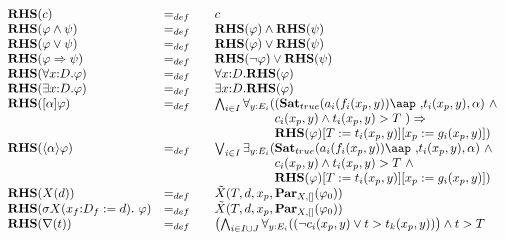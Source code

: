 \documentclass{article}
\begin{document}
\begin{equation*}
\begin{array}{lll}
{\mathbf{RHS}}(c) & =_{def} & c \\ 
{\mathbf{RHS}}(\varphi \wedge \psi ) & =_{def} & {\mathbf{RHS}}(\varphi
)\wedge {\mathbf{RHS}}(\psi ) \\ 
{\mathbf{RHS}}(\varphi \vee \psi ) & =_{def} & {\mathbf{RHS}}(\varphi )\vee {%
\mathbf{RHS}}(\psi ) \\ 
{\mathbf{RHS}}(\varphi \Rightarrow \psi ) & =_{def} & {\mathbf{RHS}}(\lnot
\varphi )\vee {\mathbf{RHS}}(\psi ) \\ 
{\mathbf{RHS}}(\forall {x{:}D}.\varphi ) & =_{def} & \forall {x{:}D}.{%
\mathbf{RHS}}(\varphi ) \\ 
{\mathbf{RHS}}(\exists {x{:}D}.\varphi ) & =_{def} & \exists {x{:}D}.{%
\mathbf{RHS}}(\varphi ) \\ 
{\mathbf{RHS}}([\alpha ]\varphi ) & =_{def} & \bigwedge_{i{\in }I}\forall _{y%
{:}E_{i}}((\mathbf{Sat}_{true }(a_{i}(f_{i}(x_{p},y))\mbox{\aap ,}%
t_{i}(x_{p},y),\alpha )\ \wedge \\ 
&  & \phantom{\bigwedge_{i {\in} I} \forall_{y {:} E_i}(}c_{i}(x_{p},y)%
\wedge t_{i}(x_{p},y)>T\ )\Rightarrow \\ 
&  & \phantom{\bigwedge_{i {\in} I} \forall_{y {:} E_i}(} {\mathbf{RHS}}%
(\varphi )[T:=t_{i}(x_{p},y)][x_{p}:=g_{i}(x_{p},y)]) \\ 
{\mathbf{RHS}}(\langle \alpha \rangle \varphi ) & =_{def} & \bigvee_{i{\in }%
I}\exists _{y{:}E_{i}}(\mathbf{Sat}_{true }(a_{i}(f_{i}(x_{p},y))%
\mbox{\aap
,}t_{i}(x_{p},y),\alpha )\ \wedge \\ 
&  & \phantom{\bigvee_{i {\in} I} \exists_{y {:} E_i}(}c_{i}(x_{p},y)\wedge
t_{i}(x_{p},y)>T\ \wedge \\ 
&  & \phantom{\bigvee_{i {\in} I} \exists_{y {:} E_i}(} {\mathbf{RHS}}%
(\varphi )[T:=t_{i}(x_{p},y)][x_{p}:=g_{i}(x_{p},y)]) \\ 
{\mathbf{RHS}}(X(d)) & =_{def} & \tilde{X}(T,d,x_{p},\mathbf{Par}%
_{X,[]}(\varphi _{0})) \\ 
{\mathbf{RHS}}(\sigma X(x_{f}{:}D_{f}:=d).~\varphi ) & =_{def}~~~ & \tilde{X}%
(T,d,x_{p},\mathbf{Par}_{X,[]}(\varphi _{0})) \\ 
{\mathbf{RHS}}(\nabla (t)) & =_{def} & \left( \bigwedge_{i{\in }I\cup
J}\forall _{y{:}E_{i}}((\lnot c_{i}(x_{p},y)\vee t>t_{k}(x_{p},y))\right)
\wedge t>T \\ 

\end{array}
\end{equation*}
\end{document}
